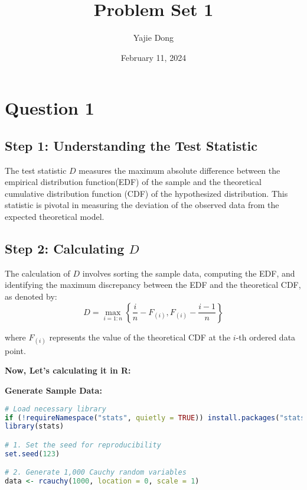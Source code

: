 \documentclass[12pt,letterpaper]{article}
\title{Problem Set 1}
\date{February 11, 2024}
\author{Yajie Dong}
\begin{document}
\maketitle


\section*{Question 1}
\subsection*{Step 1: Understanding the Test Statistic}
The test statistic \( D \) measures the maximum absolute difference between the empirical distribution function(EDF) of the sample and the theoretical cumulative distribution function (CDF) of the hypothesized distribution. This statistic is pivotal in measuring the deviation of the observed data from the expected theoretical model.

\subsection*{Step 2: Calculating \( D \)}
The calculation of  \( D \) involves sorting the sample data, computing the EDF, and identifying the maximum discrepancy between the EDF and the theoretical CDF, as denoted by:
\begin{equation}
D = \max_{i=1:n} \left\{ \frac{i}{n} - F_{(i)}, F_{(i)} - \frac{i-1}{n} \right\}
\end{equation}

where \( F_{(i)} \) represents the value of the theoretical CDF at the \( i \)-th ordered data point.

\vspace{5mm} %
\textbf{Now, Let’s calculating it in R:}
\vspace{5mm} %

\textbf{Generate Sample Data:}

\begin{lstlisting}[language=R]
# Load necessary library
if (!requireNamespace("stats", quietly = TRUE)) install.packages("stats")
library(stats)

# 1. Set the seed for reproducibility
set.seed(123)

# 2. Generate 1,000 Cauchy random variables
data <- rcauchy(1000, location = 0, scale = 1)
\end{lstlisting}
\end{document}
